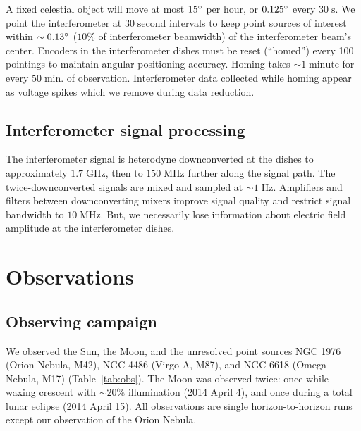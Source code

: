 \documentclass[10pt]{article}
\newcommand {\mt}{\mathrm}
\newcommand {\unit}[1]{\; \mt{#1}}
\begin{document}
A fixed celestial object will move at most $15\degree$ per hour, or $0.125\degree$ every $30 \unit{s}$.
We point the interferometer at $30 \unit{second}$ intervals to keep point sources of interest within $\sim 0.13\degree$ ($10\%$ of interferometer beamwidth) of the interferometer beam's center.
Encoders in the interferometer dishes must be reset (``homed'') every 100 pointings to maintain angular positioning accuracy.
Homing takes $\sim 1 \unit{minute}$ for every $50 \unit{min.}$ of observation.
Interferometer data collected while homing appear as voltage spikes which we  remove during data reduction.

\subsection{Interferometer signal processing}

The interferometer signal is heterodyne downconverted at the dishes to approximately $1.7 \unit{GHz}$, then to $150 \unit{MHz}$ further along the signal path.
The twice-downconverted signals are mixed and sampled at $\sim 1 \unit{Hz}$.
Amplifiers and filters between downconverting mixers improve signal quality and restrict signal bandwidth to $10 \unit{MHz}$.
But, we necessarily lose information about electric field amplitude at the interferometer dishes.

\section{Observations}

\subsection{Observing campaign}

We observed the Sun, the Moon, and the unresolved point sources NGC 1976 (Orion Nebula, M42), NGC 4486 (Virgo A, M87), and NGC 6618 (Omega Nebula, M17) (Table~\ref{tab:obs}).  The Moon was observed twice: once while waxing crescent with $\sim20\%$ illumination (2014 April 4), and once during a total lunar eclipse (2014 April 15).
All observations are single horizon-to-horizon runs except our observation of the Orion Nebula.
\end{document}
